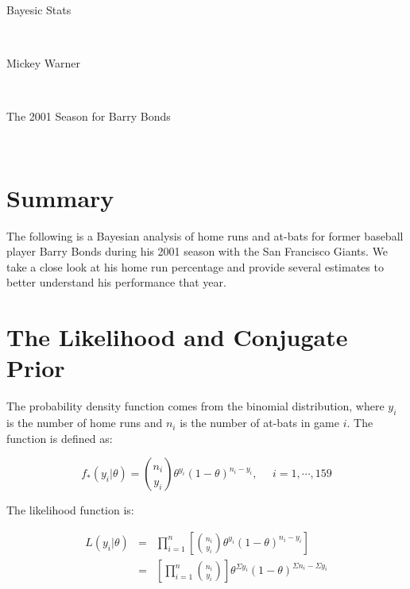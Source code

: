 \documentclass[12pt]{article}
\begin{document}
\begin{center}
\begin{Huge}
\sc Bayesic Stats
\end{Huge}
\\ [.5 cm]
\end{center}

\begin{center}
\begin{Large}
\sc Mickey Warner
\end{Large}
\\ [1.5 cm]
\end{center}

\begin{center}
\begin{LARGE}
\sc The 2001 Season for Barry Bonds
\end{LARGE}
\\ [.5 cm]
\end{center}

\section*{Summary}

\noindent The following is a Bayesian analysis of home runs and at-bats for former baseball player Barry Bonds during his 2001 season with the San Francisco Giants.  We take a close look at his home run percentage and provide several estimates to better understand his performance that year.

\section*{The Likelihood and Conjugate Prior}

The probability density function comes from the binomial distribution, where $y_i$ is the number of home runs and $n_i$ is the number of at-bats in game $i$.  The function is defined as:

\[f_*(y_i|\theta)={n_i \choose y_i}\theta^{y_i}(1-\theta)^{n_i-y_i},\ \ \ \ \ \ i=1,\cdots,159\]

\noindent The likelihood function is:

\begin{eqnarray*}
L(y_i|\theta) &=& \prod_{i=1}^n\left[{n_i \choose y_i}\theta^{y_i}(1-\theta)^{n_i-y_i}\right] \\
&=& \left[\prod_{i=1}^n{n_i \choose y_i}\right]\theta^{\Sigma y_i}(1-\theta)^{\Sigma n_i-\Sigma y_i} \\
\end{eqnarray*}
\end{document}
